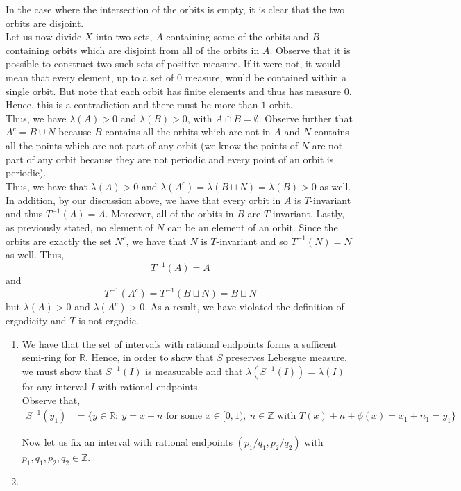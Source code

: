 \documentclass[12pt]{article}
\newenvironment{problem}[2][Problem]{\begin{trivlist}
\item[\hskip \labelsep {\bfseries #1}\hskip \labelsep {\bfseries #2.}]}{\end{trivlist}}
\begin{document}
\begin{enumerate}[label=\alph*)]
In the case where the intersection of the orbits is empty, it is clear that the two orbits are disjoint.\\

Let us now divide $X$ into two sets, $A$ containing some of the orbits and $B$ containing orbits which are disjoint from all of the orbits in $A$. Observe that it is possible to construct two such sets of positive measure. If it were not, it would mean that every element, up to a set of $0$ measure, would be contained within a single orbit. But note that each orbit has finite elements and thus has measure $0$. Hence, this is a contradiction and there must be more than $1$ orbit.\\

Thus, we have $\lambda(A) > 0$ and $\lambda(B) > 0$, with $A \cap B = \emptyset$. Observe further that $A^c = B \cup N$ because $B$ contains all the orbits which are not in $A$ and $N$ contains all the points which are not part of any orbit (we know the points of $N$ are not part of any orbit because they are not periodic and every point of an orbit is periodic).\\

Thus, we have that $\lambda(A) > 0$ and $\lambda(A^c) = \lambda(B \sqcup N) = \lambda(B) > 0$ as well. In addition, by our discussion above, we have that every orbit in $A$ is $T$-invariant and thus $T^{-1}(A) = A$. Moreover, all of the orbits in $B$ are $T$-invariant. Lastly, as previously stated, no element of $N$ can be an element of an orbit. Since the orbits are exactly the set $N^c$, we have that $N$ is $T$-invariant and so $T^{-1}(N) = N$ as well. Thus, $$T^{-1}(A) = A$$ and $$T^{-1}(A^c) = T^{-1}(B \sqcup N) = B \sqcup N$$ but $\lambda(A) > 0$ and $\lambda(A^c) > 0$. As a result, we have violated the definition of ergodicity and $T$ is not ergodic.
\end{enumerate}

\begin{problem}{6}
\end{problem}

\begin{enumerate}[label=\alph*)]

\item We have that the set of intervals with rational endpoints forms a sufficent semi-ring for $\mathbb{R}$. Hence, in order to show that $S$ preserves Lebesgue measure, we must show that $S^{-1}(I)$ is measurable and that $\lambda(S^{-1}(I)) = \lambda(I)$ for any interval $I$ with rational endpoints.\\

Observe that,
\begin{align*}
S^{-1}(y_1) &= \{y \in \mathbb{R}: \ y = x + n \text{ for some } x \in [0, 1), \ n \in \mathbb{Z} \text{ with } T(x) + n + \phi(x) = x_1 + n_1 = y_1\}
\end{align*}

Now let us fix an interval with rational endpoints $(p_1/q_1, p_2/q_2)$ with $p_1, q_1, p_2, q_2 \in \mathbb{Z}$. 

\item

\end{enumerate}
\end{document}
